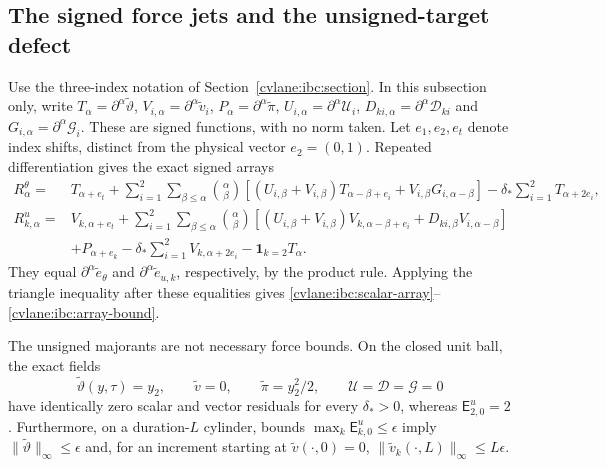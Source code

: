 \subsection{The signed force jets and the unsigned-target defect}

Use the three-index notation of Section~\ref{cvlane:ibc:section}.  In this
subsection only, write $T_\alpha=\partial^\alpha\widetilde\vartheta$,
$V_{i,\alpha}=\partial^\alpha\widetilde v_i$,
$P_\alpha=\partial^\alpha\widetilde\pi$,
$U_{i,\alpha}=\partial^\alpha\mathcal U_i$,
$D_{ki,\alpha}=\partial^\alpha\mathcal D_{ki}$ and
$G_{i,\alpha}=\partial^\alpha\mathcal G_i$.
These are signed functions, with no norm taken.  Let $e_1,e_2,e_t$
denote index shifts, distinct from the physical vector $e_2=(0,1)$.
Repeated differentiation gives the exact signed arrays
\begin{align}
 R^\theta_\alpha={}&T_{\alpha+e_t}
 +\sum_{i=1}^2\sum_{\beta\leq\alpha}\binom\alpha\beta
 \left[(U_{i,\beta}+V_{i,\beta})T_{\alpha-\beta+e_i}
       +V_{i,\beta}G_{i,\alpha-\beta}\right]
 -\delta_*\sum_{i=1}^2T_{\alpha+2e_i},
 \label{cvlane:irc:signed-scalar}\\
 R^u_{k,\alpha}={}&V_{k,\alpha+e_t}
 +\sum_{i=1}^2\sum_{\beta\leq\alpha}\binom\alpha\beta
 \left[(U_{i,\beta}+V_{i,\beta})V_{k,\alpha-\beta+e_i}
       +D_{ki,\beta}V_{i,\alpha-\beta}\right]\nonumber\\
 &+P_{\alpha+e_k}-\delta_*\sum_{i=1}^2V_{k,\alpha+2e_i}
       -\mathbf1_{k=2}T_\alpha.
 \label{cvlane:irc:signed-vector}
\end{align}
They equal $\partial^\alpha\widetilde e_\theta$ and
$\partial^\alpha\widetilde e_{u,k}$, respectively, by the product
rule.  Applying the triangle inequality after these equalities gives
\eqref{cvlane:ibc:scalar-array}--\eqref{cvlane:ibc:array-bound}.

\begin{cvlaneproposition}\label{cvlane:irc:unsigned-defect}
The unsigned majorants are not necessary force bounds.  On the closed
unit ball, the exact fields
\[
 \widetilde\vartheta(y,\tau)=y_2,\qquad
 \widetilde v=0,\qquad \widetilde\pi=y_2^2/2,\qquad
 \mathcal U=\mathcal D=\mathcal G=0
\]
have identically zero scalar and vector residuals for every
$\delta_*>0$, whereas $\mathsf E^u_{2,0}=2$.
Furthermore, on a duration-$L$ cylinder, bounds
$\max_k\mathsf E^u_{k,0}\leq\epsilon$ imply
$\|\widetilde\vartheta\|_\infty\leq\epsilon$ and, for an increment
starting at $\widetilde v(\cdot,0)=0$,
$\|\widetilde v_k(\cdot,L)\|_\infty\leq L\epsilon$.
\end{cvlaneproposition}

